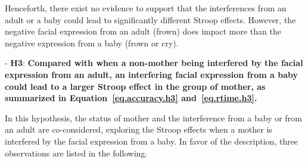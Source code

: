 Henceforth, there exist no evidence to support that the interferences from an adult or a baby could lead to significantly
different Stroop effects. However, the negative facial expression from an adult (frown) does impact more than the negative expression from a baby (frown or cry).


\noindent - \textbf{H3}:
\textbf{
Compared with when a non-mother being interfered by the facial expression from an adult,
an interfering facial expression from a baby could lead to a larger Stroop effect in the group of mother, as summarized in Equation~\ref{eq.accuracy.h3} and~\ref{eq.rtime.h3}.}

In this hypothesis, the status of mother and the interference from
a baby or from an adult are co-considered, 
exploring the Stroop effects when a mother is interfered by the 
facial expression from a baby. In favor of the description,
three observations are listed in the following.

